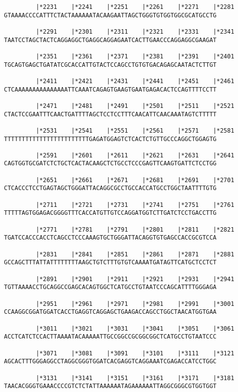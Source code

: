 \documentclass{article}
\begin{document}
\begin{Verbatim}
         |*2231    |*2241    |*2251    |*2261    |*2271    |*2281
GTAAAACCCCATTTCTACTAAAAAATACAAGAATTAGCTGGGTGTGGTGGCGCATGCCTG
  
         |*2291    |*2301    |*2311    |*2321    |*2331    |*2341
TAATCCTAGCTACTCAGGAGGCTGAGGCAGGAGAATCACTTGAACCCAGGAGGCGAAGAT
  
         |*2351    |*2361    |*2371    |*2381    |*2391    |*2401
TGCAGTGAGCTGATATCGCACCATTGTACTCCAGCCTGTGTGACAGAGCAATACTCTTGT
  
         |*2411    |*2421    |*2431    |*2441    |*2451    |*2461
CTCAAAAAAAAAAAAAAATTCAAATCAGAGTGAAGTGAATGAGACACTCCAGTTTTCCTT
  
         |*2471    |*2481    |*2491    |*2501    |*2511    |*2521
CTACTCCGAATTTCAACTGATTTTAGCTCCTCCTTTCAACATTCAACAAATAGTCTTTTT
  
         |*2531    |*2541    |*2551    |*2561    |*2571    |*2581
TTTTTTTTTTTTTTTTTTTTTTTTGAGATGGAGTCTCACTCTGTTGCCCAGGCTGGAGTG
  
         |*2591    |*2601    |*2611    |*2621    |*2631    |*2641
CAGTGGTGCGATCTCTGCTCACTACAAGCTCTGCCTCCCGAGTTCAAGTGATTCTCCTGG
  
         |*2651    |*2661    |*2671    |*2681    |*2691    |*2701
CTCACCCTCCTGAGTAGCTGGGATTACAGGCGCCTGCCACCATGCCTGGCTAATTTTGTG
  
         |*2711    |*2721    |*2731    |*2741    |*2751    |*2761
TTTTTAGTGGAGACGGGGTTTCACCATGTTGTCCAGGATGGTCTTGATCTCCTGACCTTG
  
         |*2771    |*2781    |*2791    |*2801    |*2811    |*2821
TGATCCACCCACCTCAGCCTCCCAAAGTGCTGGGATTACAGGTGTGAGCCACCGCGTCCA
  
         |*2831    |*2841    |*2851    |*2861    |*2871    |*2881
GCCAGCTTTATTATTTTTTTTAAGCTGTCTTTGTGTCAAAATGATAGTTCATGCTCCTCT
  
         |*2891    |*2901    |*2911    |*2921    |*2931    |*2941
TGTTAAAACCTGCAGGCCGAGCACAGTGGCTCATGCCTGTAATCCCAGCATTTTGGGAGA
  
         |*2951    |*2961    |*2971    |*2981    |*2991    |*3001
CCAAGGCGGATGGATCACCTGAGGTCAGGAGCTGAAGACCAGCCTGGCTAACATGGTGAA
  
         |*3011    |*3021    |*3031    |*3041    |*3051    |*3061
ACCTCATCTCCACTTAAAATACAAAAATTGCCGGCCGCGGCGGCTCATGCCTGTAATCCC
  
         |*3071    |*3081    |*3091    |*3101    |*3111    |*3121
AGCACTTTGGGAGGCCTAGGCGGGTGGATCACGAGGTCAGGAAATCGAGACCATCCTGGC
  
         |*3131    |*3141    |*3151    |*3161    |*3171    |*3181
TAACACGGGTGAAACCCCGTCTCTATTAAAAAATAGAAAAAATTAGGCGGGCGTGGTGGT
  

\end{Verbatim}
\end{document}
